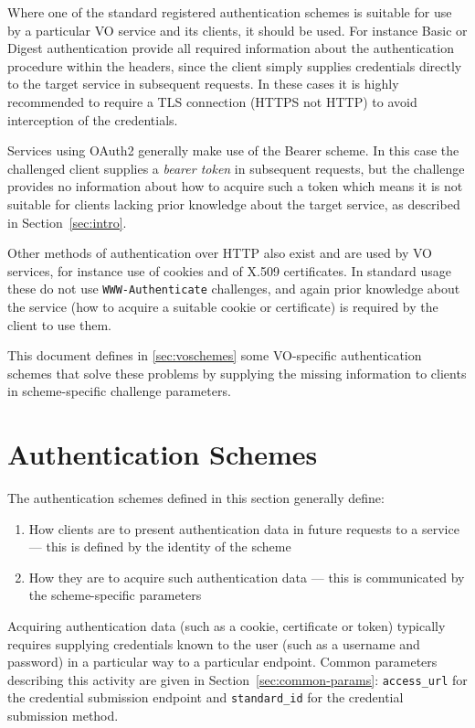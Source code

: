\documentclass[11pt,a4paper]{ivoa}
\newcommand{\header}[1]{{\tt #1}}
\begin{document}
Where one of the standard registered authentication schemes is
suitable for use by a particular VO service and its clients,
it should be used.
For instance Basic or Digest authentication provide all required
information about the authentication procedure within the headers,
since the client simply supplies credentials directly to the target
service in subsequent requests.  In these cases it is highly recommended
to require a TLS connection (HTTPS not HTTP) to avoid interception of
the credentials.

Services using OAuth2 generally make use of the Bearer scheme.
In this case the challenged client supplies a {\em bearer token}
in subsequent requests,
but the challenge provides no information about how to acquire
such a token which means it is not suitable for clients lacking
prior knowledge about the target service, as described in
Section~\ref{sec:intro}.

Other methods of authentication over HTTP also exist
and are used by VO services,
for instance use of cookies and of X.509 certificates.
In standard usage these do not use \header{WWW-Authenticate} challenges,
and again prior knowledge about the service
(how to acquire a suitable cookie or certificate)
is required by the client to use them.

This document defines in \ref{sec:voschemes}
some VO-specific authentication schemes
that solve these problems by supplying the missing information to
clients in scheme-specific challenge parameters.

\section{Authentication Schemes}\label{sec:authschemes}

The authentication schemes defined in this section
generally define:
\begin{enumerate}
  \item How clients are to present authentication data in future requests
        to a service --- this is defined by the identity of the scheme
  \item How they are to acquire such authentication data ---
        this is communicated by the scheme-specific parameters
\end{enumerate}
Acquiring authentication data (such as a cookie, certificate or token)
typically requires supplying credentials known to the user 
(such as a username and password) in a particular way to a particular
endpoint.
Common parameters describing this activity are given in
Section~\ref{sec:common-params}:
\verb|access_url| for the credential submission endpoint and
\verb|standard_id| for the credential submission method.
\end{document}
